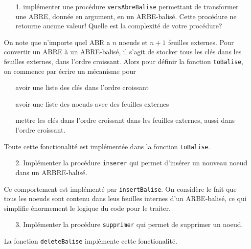 \documentclass[10pt]{article} %
\begin{document}
\vspace{1cm}
\noindent {} 

\begin{itemize}
    \item[1.] implémenter une procédure \texttt{versAbreBalise} permettant de transformer une ABRE, donnée en argument, en un
    ARBE-balisé. Cette procédure ne retourne aucune valeur! Quelle est la complexité de votre procédure?
\end{itemize}

On note que n'importe quel ABR a $n$ noeuds et $n + 1$ feuilles externes. Pour convertir un ABRE à un ABRE-balisé, il s'agit de stocker tous les clés
dans les feuilles externes, dans l'ordre croissant. Alors pour définir la fonction \texttt{toBalise}, on commence par écrire un mécanisme pour
\begin{itemize}
    \item[\ding{43}] avoir une liste des clés dans l'ordre croissant
    \item[\ding{43}] avoir une liste des noeuds avec des feuilles externes
    \item[\ding{43}] mettre les clés dans l'ordre croissant dans les feuilles externes, aussi dans l'ordre croissant.
\end{itemize}

Toute cette fonctionalité est implémentée dans la fonction \texttt{toBalise}.

\begin{itemize}
    \item[2.] Implémenter la procédure \texttt{inserer} qui permet d'insérer un nouveau noeud dans un ARBRE-balisé.
\end{itemize}

Ce comportement est implémenté par \texttt{insertBalise}. On considère le fait que tous les noeuds sont contenu dans leus feuilles
internes d'un ARBE-balisé, ce qui simplifie énormement le logique du code pour le traiter.

\begin{itemize}
    \item[3.] Implémenter la procédure \texttt{supprimer} qui permet de supprimer un noeud.
\end{itemize}

La fonction \texttt{deleteBalise} implémente cette fonctionalité.


\vspace{1cm}
\noindent {} 

\end{document}
